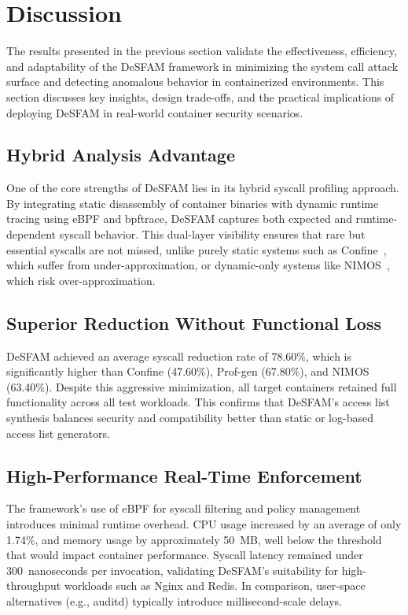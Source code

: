 \section{Discussion}
\label{sec:discussion}

The results presented in the previous section validate the effectiveness, efficiency, and
adaptability of the DeSFAM framework in minimizing the system call attack surface and detecting
anomalous behavior in containerized environments. This section discusses key insights, design
trade-offs, and the practical implications of deploying DeSFAM in real-world container security
scenarios.

\subsection{Hybrid Analysis Advantage}
\label{subsec:hybrid_advantage}

One of the core strengths of DeSFAM lies in its hybrid syscall profiling approach. By
integrating static disassembly of container binaries with dynamic runtime tracing using eBPF
and bpftrace, DeSFAM captures both expected and runtime-dependent syscall behavior. This
dual-layer visibility ensures that rare but essential syscalls are not missed, unlike purely
static systems such as Confine~\cite{ref31_confine}, which suffer from under-approximation, or
dynamic-only systems like NIMOS~\cite{ref38_nimos}, which risk over-approximation.

\subsection{Superior Reduction Without Functional Loss}
\label{subsec:reduction_advantage}

DeSFAM achieved an average syscall reduction rate of 78.60\%, which is significantly higher than
Confine (47.60\%), Prof-gen (67.80\%), and NIMOS (63.40\%). Despite this aggressive
minimization, all target containers retained full functionality across all test workloads. This
confirms that DeSFAM's access list synthesis balances security and compatibility better than
static or log-based access list generators.

\subsection{High-Performance Real-Time Enforcement}
\label{subsec:performance_advantage}

The framework's use of eBPF for syscall filtering and policy management introduces minimal
runtime overhead. CPU usage increased by an average of only 1.74\%, and memory usage by
approximately 50~MB, well below the threshold that would impact container performance. Syscall
latency remained under 300~nanoseconds per invocation, validating DeSFAM's suitability for
high-throughput workloads such as Nginx and Redis. In comparison, user-space alternatives
(e.g., auditd) typically introduce millisecond-scale delays.

